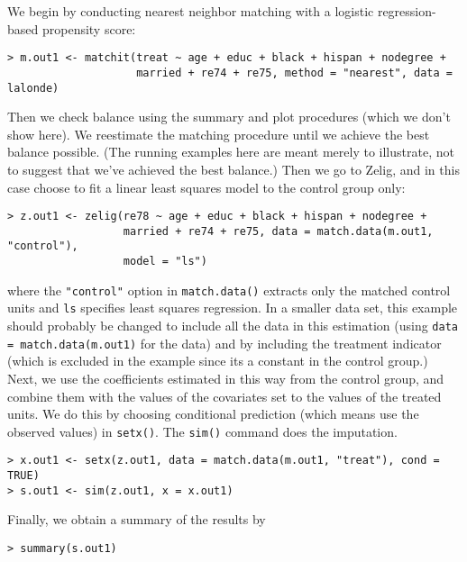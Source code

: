 \begin{description}
  We begin by conducting nearest neighbor matching with a logistic
  regression-based propensity score:
\begin{verbatim}
> m.out1 <- matchit(treat ~ age + educ + black + hispan + nodegree + 
                    married + re74 + re75, method = "nearest", data = lalonde)
\end{verbatim}
  Then we check balance using the summary and plot procedures (which
  we don't show here).  We reestimate the matching procedure until we
  achieve the best balance possible.  (The running examples here are
  meant merely to illustrate, not to suggest that we've achieved the
  best balance.)  Then we go to Zelig, and in this case choose to fit
  a linear least squares model to the control group only:
\begin{verbatim}
> z.out1 <- zelig(re78 ~ age + educ + black + hispan + nodegree + 
                  married + re74 + re75, data = match.data(m.out1, "control"), 
                  model = "ls")
\end{verbatim}
  where the {\tt "control"} option in {\tt match.data()} extracts only
  the matched control units and {\tt ls} specifies least squares
  regression.  In a smaller data set, this example should probably be
  changed to include all the data in this estimation (using
  \texttt{data = match.data(m.out1)} for the data) and by including
  the treatment indicator (which is excluded in the example since its
  a constant in the control group.)  Next, we use the coefficients
  estimated in this way from the control group, and combine them with
  the values of the covariates set to the values of the treated units.
  We do this by choosing conditional prediction (which means use the
  observed values) in \texttt{setx()}.  The {\tt sim()} command does
  the imputation.
\begin{verbatim}
> x.out1 <- setx(z.out1, data = match.data(m.out1, "treat"), cond = TRUE)
> s.out1 <- sim(z.out1, x = x.out1)
\end{verbatim}
Finally, we obtain a summary of the results by 
\begin{verbatim}
> summary(s.out1)
\end{verbatim}


\end{description}
